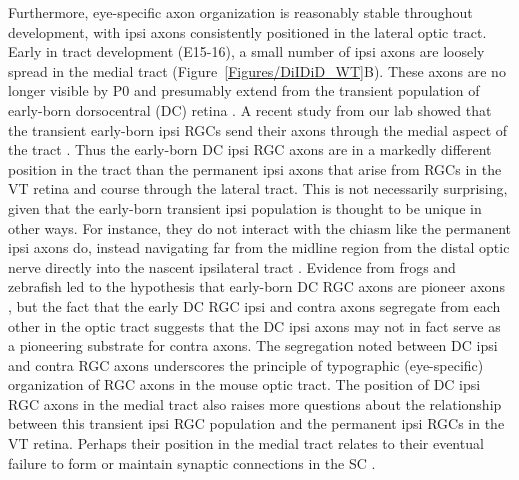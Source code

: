 Furthermore, eye-specific axon organization is reasonably stable throughout development, with ipsi axons consistently positioned in the lateral optic tract.
Early in tract development (E15-16), a small number of ipsi axons are loosely spread in the medial tract (Figure~\ref{Figures/DiIDiD_WT}B).
These axons are no longer visible by P0 and presumably extend from the transient population of early-born dorsocentral (DC) retina \cite{drager1985birth,soares2015transient}.
A recent study from our lab showed that the transient early-born ipsi RGCs send their axons through the medial aspect of the tract \cite{soares2015transient}.
Thus the early-born DC ipsi RGC axons are in a markedly different position in the tract than the permanent ipsi axons that arise from RGCs in the VT retina and course through the lateral tract.
This is not necessarily surprising, given that the early-born transient ipsi population is thought to be unique in other ways.
For instance, they do not interact with the chiasm like the permanent ipsi axons do, instead navigating far from the midline region from the distal optic nerve directly into the nascent ipsilateral tract \cite{godement1987study,marcus1995first,godement1990retinal}.
Evidence from frogs and zebrafish led to the hypothesis that early-born DC RGC axons are pioneer axons \cite{pittman2008pathfinding,holt1984does}, but the fact that the early DC RGC ipsi and contra axons segregate from each other in the optic tract \cite{soares2015transient} suggests that the DC ipsi axons may not in fact serve as a pioneering substrate for contra axons.
The segregation noted between DC ipsi and contra RGC axons underscores the principle of typographic (eye-specific) organization of RGC axons in the mouse optic tract.
The position of DC ipsi RGC axons in the medial tract also raises more questions about the relationship between this transient ipsi RGC population and the permanent ipsi RGCs in the VT retina.
Perhaps their position in the medial tract relates to their eventual failure to form or maintain synaptic connections in the SC \cite{soares2015transient}.

